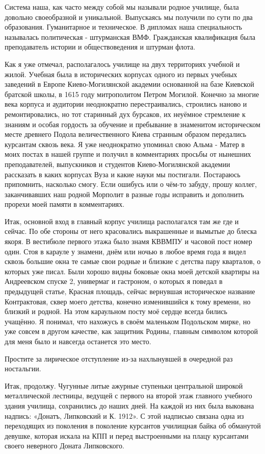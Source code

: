 Система наша, как
часто между собой мы называли родное училище, была довольно своеобразной и
уникальной. Выпускаясь мы получили по сути по два образования. Гуманитарное и
техническое. В дипломах наша специальность называлась политическая -
штурманская ВМФ. Гражданская квалификация была преподаватель истории и
обществоведения и штурман флота. 

Как я уже отмечал, располагалось училище на
двух территориях учебной и жилой. Учебная была в исторических корпусах одного
из первых учебных заведений в Европе Киево-Могилянской академии основанной
на базе Киевской братской школы, в 1615 году митрополитом Петром Могилой.
Конечно за многие века корпуса и аудитории неоднократно перестраивались,
строились наново и ремонтировались, но тот старинный дух бурсаков, их неуёмное
стремление к знаниям и особая гордость за обучение и пребывание в знаменитом
историческом месте древнего Подола величественного Киева странным образом
передались курсантам сквозь века. Я уже неоднократно упоминал свою Альма -
Матер в моих постах в нашей группе и получил в комментариях просьбы от нынешних
преподавателей, выпускников и студентов Киево-Могилянской академии
рассказать в каких корпусах Вуза и какие науки мы постигали. Постараюсь
припомнить, насколько смогу. Если ошибусь или о чём-то забуду, прошу коллег,
заканчивавших наш родной Морполит в разные годы исправить и дополнить прорехи
моей памяти в комментариях. 

Итак, основной вход в главный корпус училища располагался там же где и сейчас.
По обе стороны от него красовались выкрашенные и вымытые до блеска якоря. В
вестибюле первого этажа было знамя КВВМПУ и часовой пост номер один. Стоя в
карауле у знамени, днём или ночью в любое время года я видел сквозь большие
окна те самые свои родные и близкие с детства пару кварталов, о которых уже
писал. Были хорошо видны боковые окна моей детской квартиры на Андреевском
спуске 2, универмаг и гастроном, о которых я поведал в предыдущей статье,
Красная площадь, сейчас вернувшая историческое название Контрактовая, сквер
моего детства, конечно изменившийся к тому времени, но близкий и родной. На
этом караульном посту моё сердце всегда бились учащённо. Я понимал, что
нахожусь в своём маленьком Подольском мирке, но уже совсем в другом качестве,
как защитник Родины, главным символом которой для меня было и навсегда
останется это место. 

Простите за лирическое отступление
из-за нахлынувшей в очередной раз ностальгии. 

Итак, продолжу. Чугунные литые
ажурные ступеньки центральной широкой металлической лестницы, ведущей с первого
на второй этаж главного учебного здания училища, сохранились до наших дней. На
каждой из них была выкована надпись: «Донатъ, Липковский и К. 1912». С этой
надписью связана одна из переходящих из поколения в поколение курсантов
училищная байка об обманутой девушке, которая искала на КПП и перед
выстроенными на плацу курсантами своего неверного Доната Липковского. 

